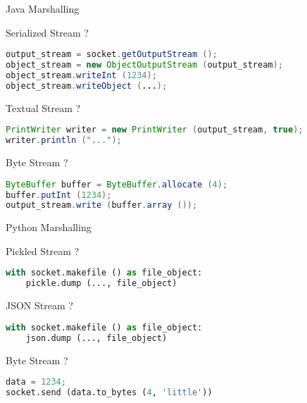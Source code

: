 \begin{frame}[fragile]{Java Marshalling}
    \begin{block}{Serialized Stream ?}
\begin{lstlisting}[language=java,style=mini]
output_stream = socket.getOutputStream ();
object_stream = new ObjectOutputStream (output_stream);
object_stream.writeInt (1234);
object_stream.writeObject (...);
\end{lstlisting}
    \end{block}
    \begin{block}{Textual Stream ?}
\begin{lstlisting}[language=java,style=mini]
PrintWriter writer = new PrintWriter (output_stream, true);
writer.println ("...");
\end{lstlisting}
    \end{block}
    \begin{block}{Byte Stream ?}
\begin{lstlisting}[language=java,style=mini]
ByteBuffer buffer = ByteBuffer.allocate (4);
buffer.putInt (1234);
output_stream.write (buffer.array ());
\end{lstlisting}
    \end{block}
\end{frame}


\begin{frame}[fragile]{Python Marshalling}
    \begin{block}{Pickled Stream ?}
\begin{lstlisting}[language=python,style=mini]
with socket.makefile () as file_object:
    pickle.dump (..., file_object)
\end{lstlisting}
    \end{block}
    \begin{block}{JSON Stream ?}
\begin{lstlisting}[language=python,style=mini]
with socket.makefile () as file_object:
    json.dump (..., file_object)
\end{lstlisting}
    \end{block}
    \begin{block}{Byte Stream ?}
\begin{lstlisting}[language=python,style=mini]
data = 1234;
socket.send (data.to_bytes (4, 'little'))
\end{lstlisting}
    \end{block}
\end{frame}


